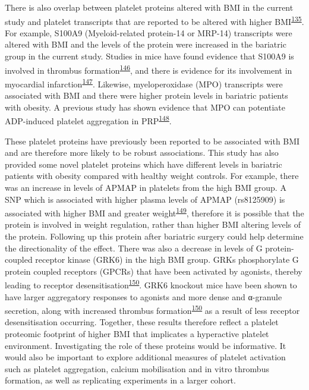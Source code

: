 \documentclass[11pt,twoside]{bristolthesis}
\begin{document}
There is also overlap between platelet proteins altered with BMI in the current study and platelet transcripts that are reported to be altered with higher BMI\textsuperscript{\protect\hyperlink{ref-Freedman2010}{135}}. For example, S100A9 (Myeloid-related protein-14 or MRP-14) transcripts were altered with BMI and the levels of the protein were increased in the bariatric group in the current study. Studies in mice have found evidence that S100A9 is involved in thrombus formation\textsuperscript{\protect\hyperlink{ref-Wang2014a}{146}}, and there is evidence for its involvement in myocardial infarction\textsuperscript{\protect\hyperlink{ref-Cai2020}{147}}. Likewise, myeloperoxidase (MPO) transcripts were associated with BMI and there were higher protein levels in bariatric patients with obesity. A previous study has shown evidence that MPO can potentiate ADP-induced platelet aggregation in PRP\textsuperscript{\protect\hyperlink{ref-Gorudko2013}{148}}.

These platelet proteins have previously been reported to be associated with BMI and are therefore more likely to be robust associations. This study has also provided some novel platelet proteins which have different levels in bariatric patients with obesity compared with healthy weight controls. For example, there was an increase in levels of APMAP in platelets from the high BMI group. A SNP which is associated with higher plasma levels of APMAP (rs8125909) is associated with higher BMI and greater weight\textsuperscript{\protect\hyperlink{ref-Liu2021}{149}}, therefore it is possible that the protein is involved in weight regulation, rather than higher BMI altering levels of the protein. Following up this protein after bariatric surgery could help determine the directionality of the effect. There was also a decrease in levels of G protein-coupled receptor kinase (GRK6) in the high BMI group. GRKs phosphorylate G protein coupled receptors (GPCRs) that have been activated by agonists, thereby leading to receptor desensitisation\textsuperscript{\protect\hyperlink{ref-Chaudhary2020}{150}}. GRK6 knockout mice have been shown to have larger aggregatory responses to agonists and more dense and α-granule secretion, along with increased thrombus formation\textsuperscript{\protect\hyperlink{ref-Chaudhary2020}{150}} as a result of less receptor desensitisation occurring. Together, these results therefore reflect a platelet proteomic footprint of higher BMI that implicates a hyperactive platelet environment. Investigating the role of these proteins would be informative. It would also be important to explore additional measures of platelet activation such as platelet aggregation, calcium mobilisation and in vitro thrombus formation, as well as replicating experiments in a larger cohort.
\end{document}
